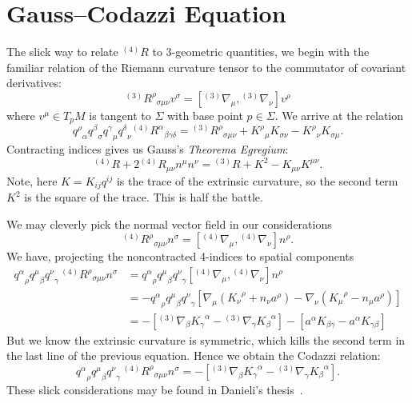 \section{Gauss--Codazzi Equation}

The slick way to relate ${}^{(4)}R$ to 3-geometric quantities, we begin
with the familiar relation of the Riemann curvature tensor to the
commutator of covariant derivatives:
\begin{equation}
{}^{(3)}{R^{\rho}}_{\sigma\mu\nu}v^{\sigma}
  = [{}^{(3)}\nabla_{\mu}, {}^{(3)}\nabla_{\nu}]v^{\rho}
\end{equation}
where $v^{\mu}\in T_{p}M$ is tangent to $\Sigma$ with base point
$p\in\Sigma$.
We arrive at the relation
\begin{equation}
{q^{\rho}}_{\alpha}{q^{\beta}}_{\sigma}{q^{\gamma}}_{\mu}{q^{\delta}}_{\nu}
{{}^{(4)}\!}{R^{\alpha}}_{\beta\gamma\delta}
={{}^{(3)}\!}{R^{\rho}}_{\sigma\mu\nu} + {K^{\rho}}_{\mu}K_{\sigma\nu}-{K^{\rho}}_{\nu}K_{\sigma\mu}.
\end{equation}
Contracting indices gives us Gauss's \textit{Theorema Egregium}:
\begin{equation}\label{eq:gauss-codazzi:theorem-egregium}
\boxed{{{}^{(4)}\!}{R} + 2{{}^{(4)}\!}{R}_{\mu\nu}n^{\mu}n^{\nu}
={{}^{(3)}\!}{R} + K^{2} - K_{\mu\nu}K^{\mu\nu}.}
\end{equation}
Note, here $K=K_{ij}q^{ij}$ is the trace of the extrinsic curvature, so
the second term $K^{2}$ is the square of the trace.
This is half the battle.

We may cleverly pick the normal vector field in our considerations
\begin{equation}
{}^{(4)}{R^{\rho}}_{\sigma\mu\nu}n^{\sigma}
  = [{}^{(4)}\nabla_{\mu}, {}^{(4)}\nabla_{\nu}]n^{\rho}.
\end{equation}
We have, projecting the noncontracted 4-indices to spatial components
\begin{subequations}
\begin{align}
{q^{\alpha}}_{\rho}{q^{\mu}}_{\beta}{q^{\nu}}_{\gamma}\,
  {}^{(4)}{R^{\rho}}_{\sigma\mu\nu}n^{\sigma}
&={q^{\alpha}}_{\rho}{q^{\mu}}_{\beta}{q^{\nu}}_{\gamma}[{}^{(4)}\nabla_{\mu}, {}^{(4)}\nabla_{\nu}]n^{\rho}\\
&=-{q^{\alpha}}_{\rho}{q^{\mu}}_{\beta}{q^{\nu}}_{\gamma}[\nabla_{\mu}({K_{\nu}}^{\rho}+n_{\nu}a^{\rho})-\nabla_{\nu}({K_{\mu}}^{\rho}-n_{\mu}a^{\rho})]\\
&=-[{}^{(3)}\nabla_{\beta}{K_{\gamma}}^{\alpha} - {}^{(3)}\nabla_{\gamma}{K_{\beta}}^{\alpha}]-[a^{\alpha}K_{\beta\gamma}-a^{\alpha}K_{\gamma\beta}]
\end{align}
\end{subequations}
But we know the extrinsic curvature is symmetric, which kills the second
term in the last line of the previous equation. Hence we obtain the
Codazzi relation:
\begin{equation}
\boxed{{q^{\alpha}}_{\rho}{q^{\mu}}_{\beta}{q^{\nu}}_{\gamma}\, {}^{(4)}{R^{\rho}}_{\sigma\mu\nu}n^{\sigma}
=-[{}^{(3)}\nabla_{\beta}{K_{\gamma}}^{\alpha} - {}^{(3)}\nabla_{\gamma}{K_{\beta}}^{\alpha}].}
\end{equation}
These slick considerations may be found in Danieli's thesis~\cite[see \S2.3]{danieli}.

